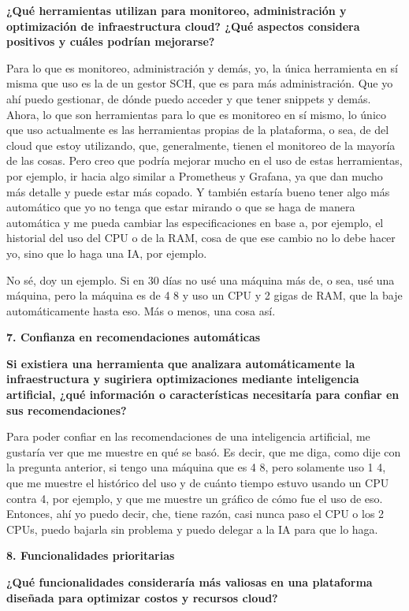 \textbf{¿Qué herramientas utilizan para monitoreo, administración y optimización de infraestructura cloud? ¿Qué aspectos considera positivos y cuáles podrían mejorarse?}

Para lo que es monitoreo, administración y demás, yo, la única herramienta en sí misma que uso es la de un gestor SCH, que es para más administración. Que yo ahí puedo gestionar, de dónde puedo acceder y que tener snippets y demás. Ahora, lo que son herramientas para lo que es monitoreo en sí mismo, lo único que uso actualmente es las herramientas propias de la plataforma, o sea, de del cloud que estoy utilizando, que, generalmente, tienen el monitoreo de la mayoría de las cosas. Pero creo que podría mejorar mucho en el uso de estas herramientas, por ejemplo, ir hacia algo similar a Prometheus y Grafana, ya que dan mucho más detalle y puede estar más copado. Y también estaría bueno tener algo más automático que yo no tenga que estar mirando o que se haga de manera automática y me pueda cambiar las especificaciones en base a, por ejemplo, el historial del uso del CPU o de la RAM, cosa de que ese cambio no lo debe hacer yo, sino que lo haga una IA, por ejemplo.

No sé, doy un ejemplo. Si en 30 días no usé una máquina más de, o sea, usé una máquina, pero la máquina es de 4 8 y uso un CPU y 2 gigas de RAM, que la baje automáticamente hasta eso. Más o menos, una cosa así.

\textbf{7. Confianza en recomendaciones automáticas}

\textbf{Si existiera una herramienta que analizara automáticamente la infraestructura y sugiriera optimizaciones mediante inteligencia artificial, ¿qué información o características necesitaría para confiar en sus recomendaciones?}

Para poder confiar en las recomendaciones de una inteligencia artificial, me gustaría ver que me muestre en qué se basó. Es decir, que me diga, como dije con la pregunta anterior, si tengo una máquina que es 4 8, pero solamente uso 1 4, que me muestre el histórico del uso y de cuánto tiempo estuvo usando un CPU contra 4, por ejemplo, y que me muestre un gráfico de cómo fue el uso de eso. Entonces, ahí yo puedo decir, che, tiene razón, casi nunca paso el CPU o los 2 CPUs, puedo bajarla sin problema y puedo delegar a la IA para que lo haga.

\textbf{8. Funcionalidades prioritarias}

\textbf{¿Qué funcionalidades consideraría más valiosas en una plataforma diseñada para optimizar costos y recursos cloud?}

